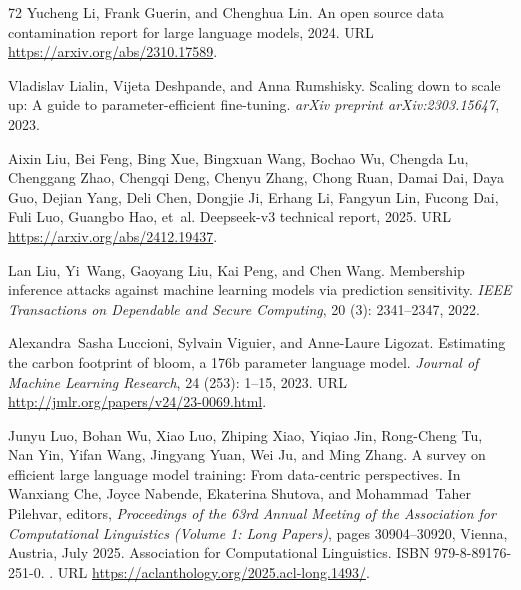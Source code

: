 \begin{thebibliography}{72}
Yucheng Li, Frank Guerin, and Chenghua Lin.
\newblock An open source data contamination report for large language models, 2024.
\newblock URL \url{https://arxiv.org/abs/2310.17589}.

Vladislav Lialin, Vijeta Deshpande, and Anna Rumshisky.
\newblock Scaling down to scale up: A guide to parameter-efficient fine-tuning.
\newblock \emph{arXiv preprint arXiv:2303.15647}, 2023.

Aixin Liu, Bei Feng, Bing Xue, Bingxuan Wang, Bochao Wu, Chengda Lu, Chenggang Zhao, Chengqi Deng, Chenyu Zhang, Chong Ruan, Damai Dai, Daya Guo, Dejian Yang, Deli Chen, Dongjie Ji, Erhang Li, Fangyun Lin, Fucong Dai, Fuli Luo, Guangbo Hao, et~al.
\newblock Deepseek-v3 technical report, 2025.
\newblock URL \url{https://arxiv.org/abs/2412.19437}.

Lan Liu, Yi~Wang, Gaoyang Liu, Kai Peng, and Chen Wang.
\newblock Membership inference attacks against machine learning models via prediction sensitivity.
\newblock \emph{IEEE Transactions on Dependable and Secure Computing}, 20 (3): 2341--2347, 2022.

Alexandra~Sasha Luccioni, Sylvain Viguier, and Anne-Laure Ligozat.
\newblock Estimating the carbon footprint of bloom, a 176b parameter language model.
\newblock \emph{Journal of Machine Learning Research}, 24 (253): 1--15, 2023.
\newblock URL \url{http://jmlr.org/papers/v24/23-0069.html}.

Junyu Luo, Bohan Wu, Xiao Luo, Zhiping Xiao, Yiqiao Jin, Rong-Cheng Tu, Nan Yin, Yifan Wang, Jingyang Yuan, Wei Ju, and Ming Zhang.
\newblock A survey on efficient large language model training: From data-centric perspectives.
\newblock In Wanxiang Che, Joyce Nabende, Ekaterina Shutova, and Mohammad~Taher Pilehvar, editors, \emph{Proceedings of the 63rd Annual Meeting of the Association for Computational Linguistics (Volume 1: Long Papers)}, pages 30904--30920, Vienna, Austria, July 2025. Association for Computational Linguistics.
\newblock ISBN 979-8-89176-251-0.
\newblock {}.
\newblock URL \url{https://aclanthology.org/2025.acl-long.1493/}.


\end{thebibliography}
